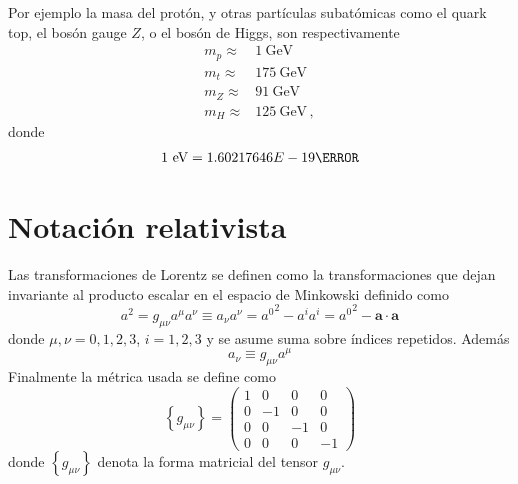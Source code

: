 \begin{frame}
Por ejemplo la masa del protón, y otras partículas subatómicas como el quark top, el bosón gauge $Z$, o el bosón de Higgs, son respectivamente
\begin{align*}
  m_p\approx &1\ \text{GeV}\\
  m_t\approx& 175\ \text{GeV}\\
  m_Z\approx& 91\ \text{GeV}\\
  m_H\approx& 125\ \text{GeV}\,,
\end{align*}
donde
\begin{align*}
  1\ \text{eV}=\SI{1.60217646E-19}{\joule}
\end{align*}

\end{frame}
\section{Notación relativista}
\label{sec:srn}
Las transformaciones de Lorentz se definen como la transformaciones que dejan invariante al producto escalar en el espacio de Minkowski definido como
\begin{equation}
  \label{eq:146qft}
  a^2=g_{\mu\nu}a^\mu a^\nu\equiv a_\nu a^\nu={a^0}^2-a^i a^i={a^0}^2-\mathbf{a}\cdot\mathbf{a}
\end{equation}
donde $\mu,\nu=0,1,2,3$, $i=1,2,3$ y se asume suma sobre índices repetidos. Además
\begin{equation}
\label{eq:149qft}
  a_\nu\equiv g_{\mu\nu}a^\mu
\end{equation}
 Finalmente la métrica usada se define como
\begin{equation}
  \label{eq:gmunu}
  \left\{ g_{\mu\nu} \right\}=
  \begin{pmatrix}
    1&0&0&0\\
    0&-1&0&0\\
    0&0&-1&0\\
    0&0&0&-1
  \end{pmatrix}
\end{equation}
donde $\left\{ g_{\mu\nu} \right\}$ denota la forma matricial del tensor $g_{\mu\nu}$.  

